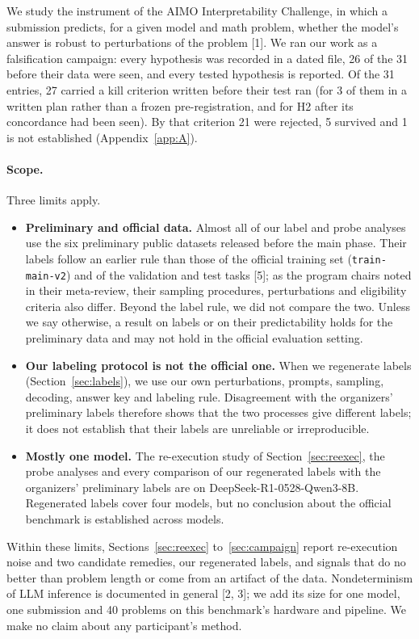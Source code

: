 \documentclass{article}
\begin{document}
We study the instrument of the AIMO Interpretability Challenge, in which a submission predicts, for a given model and math problem, whether the model's answer is robust to perturbations of the problem [1]. We ran our work as a falsification campaign: every hypothesis was recorded in a dated file, 26 of the 31 before their data were seen, and every tested hypothesis is reported. Of the 31 entries, 27 carried a kill criterion written before their test ran (for 3 of them in a written plan rather than a frozen pre-registration, and for H2 after its concordance had been seen). By that criterion 21 were rejected, 5 survived and 1 is not established (Appendix~\ref{app:A}).

\paragraph{Scope.} Three limits apply.
\begin{itemize}
\item \textbf{Preliminary and official data.} Almost all of our label and probe analyses use the six preliminary public datasets released before the main phase. Their labels follow an earlier rule than those of the official training set (\texttt{train-main-v2}) and of the validation and test tasks [5]; as the program chairs noted in their meta-review, their sampling procedures, perturbations and eligibility criteria also differ. Beyond the label rule, we did not compare the two. Unless we say otherwise, a result on labels or on their predictability holds for the preliminary data and may not hold in the official evaluation setting.
\item \textbf{Our labeling protocol is not the official one.} When we regenerate labels (Section~\ref{sec:labels}), we use our own perturbations, prompts, sampling, decoding, answer key and labeling rule. Disagreement with the organizers' preliminary labels therefore shows that the two processes give different labels; it does not establish that their labels are unreliable or irreproducible.
\item \textbf{Mostly one model.} The re-execution study of Section~\ref{sec:reexec}, the probe analyses and every comparison of our regenerated labels with the organizers' preliminary labels are on DeepSeek-R1-0528-Qwen3-8B. Regenerated labels cover four models, but no conclusion about the official benchmark is established across models.
\end{itemize}

Within these limits, Sections~\ref{sec:reexec} to~\ref{sec:campaign} report re-execution noise and two candidate remedies, our regenerated labels, and signals that do no better than problem length or come from an artifact of the data. Nondeterminism of LLM inference is documented in general [2, 3]; we add its size for one model, one submission and 40 problems on this benchmark's hardware and pipeline. We make no claim about any participant's method.
\end{document}
